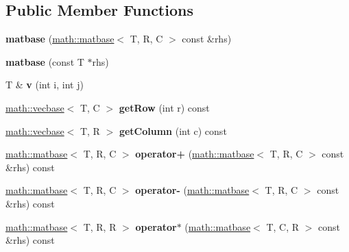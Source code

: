 \subsection*{Public Member Functions}
\begin{DoxyCompactItemize}
\item 
\hypertarget{classmath_1_1matbase_ac89f35bb51c718bd42cc7032891708e0}{
{\bfseries matbase} (\hyperlink{classmath_1_1matbase}{math::matbase}$<$ T, R, C $>$ const \&rhs)}
\label{classmath_1_1matbase_ac89f35bb51c718bd42cc7032891708e0}

\item 
\hypertarget{classmath_1_1matbase_af068cbc67739326385ac9eabf8552839}{
{\bfseries matbase} (const T $\ast$rhs)}
\label{classmath_1_1matbase_af068cbc67739326385ac9eabf8552839}

\item 
\hypertarget{classmath_1_1matbase_ab2cb6c5e339162b340a5f90046dc9dab}{
T \& {\bfseries v} (int i, int j)}
\label{classmath_1_1matbase_ab2cb6c5e339162b340a5f90046dc9dab}

\item 
\hypertarget{classmath_1_1matbase_a5fbb44c1ab780ab8a2c193153e333348}{
\hyperlink{classmath_1_1vecbase}{math::vecbase}$<$ T, C $>$ {\bfseries getRow} (int r) const }
\label{classmath_1_1matbase_a5fbb44c1ab780ab8a2c193153e333348}

\item 
\hypertarget{classmath_1_1matbase_a834d61043d4e8170822cd6a5031b3edd}{
\hyperlink{classmath_1_1vecbase}{math::vecbase}$<$ T, R $>$ {\bfseries getColumn} (int c) const }
\label{classmath_1_1matbase_a834d61043d4e8170822cd6a5031b3edd}

\item 
\hypertarget{classmath_1_1matbase_ab0ef1811c4e2d846e48848f6e1aa5f6e}{
\hyperlink{classmath_1_1matbase}{math::matbase}$<$ T, R, C $>$ {\bfseries operator+} (\hyperlink{classmath_1_1matbase}{math::matbase}$<$ T, R, C $>$ const \&rhs) const }
\label{classmath_1_1matbase_ab0ef1811c4e2d846e48848f6e1aa5f6e}

\item 
\hypertarget{classmath_1_1matbase_ac2de40f2f97e4a9dff5c1af3cc47fdc5}{
\hyperlink{classmath_1_1matbase}{math::matbase}$<$ T, R, C $>$ {\bfseries operator-\/} (\hyperlink{classmath_1_1matbase}{math::matbase}$<$ T, R, C $>$ const \&rhs) const }
\label{classmath_1_1matbase_ac2de40f2f97e4a9dff5c1af3cc47fdc5}

\item 
\hypertarget{classmath_1_1matbase_af15e75eb262bfb3f4afdd561f2b38f30}{
\hyperlink{classmath_1_1matbase}{math::matbase}$<$ T, R, R $>$ {\bfseries operator$\ast$} (\hyperlink{classmath_1_1matbase}{math::matbase}$<$ T, C, R $>$ const \&rhs) const }
\label{classmath_1_1matbase_af15e75eb262bfb3f4afdd561f2b38f30}


\end{DoxyCompactItemize}
